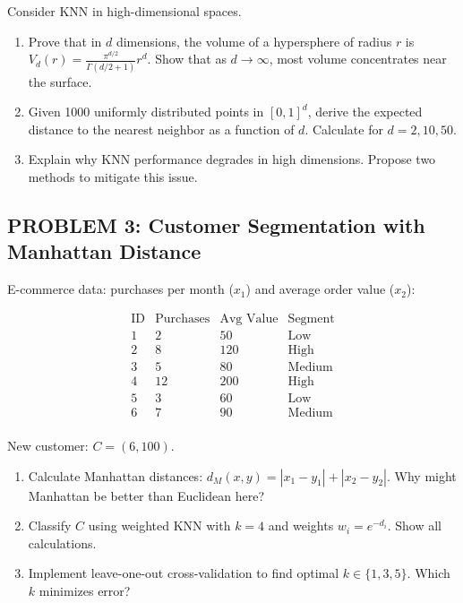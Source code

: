 \documentclass[12pt]{article}
\begin{document}
Consider KNN in high-dimensional spaces.

\begin{enumerate}
\item[(a)] Prove that in \(d\) dimensions, the volume of a hypersphere of radius \(r\) is \(V_d(r) = \frac{\pi^{d/2}}{\Gamma(d/2 + 1)}r^d\). Show that as \(d \to \infty\), most volume concentrates near the surface.
\item[(b)] Given 1000 uniformly distributed points in \([0,1]^d\), derive the expected distance to the nearest neighbor as a function of \(d\). Calculate for \(d = 2, 10, 50\).
\item[(c)] Explain why KNN performance degrades in high dimensions. Propose two methods to mitigate this issue.
\end{enumerate}

\subsection*{PROBLEM 3: Customer Segmentation with Manhattan Distance}

E-commerce data: purchases per month (\(x_1\)) and average order value (\(x_2\)):

\[\begin{array}{c|cc|c}
\text{ID} & \text{Purchases} & \text{Avg Value} & \text{Segment} \\
\hline
1 & 2 & 50 & \text{Low} \\
2 & 8 & 120 & \text{High} \\
3 & 5 & 80 & \text{Medium} \\
4 & 12 & 200 & \text{High} \\
5 & 3 & 60 & \text{Low} \\
6 & 7 & 90 & \text{Medium} \\
\end{array}\]

New customer: \(C = (6, 100)\).

\begin{enumerate}
\item[(a)] Calculate Manhattan distances: \(d_M(x,y) = |x_1-y_1| + |x_2-y_2|\). Why might Manhattan be better than Euclidean here?
\item[(b)] Classify \(C\) using weighted KNN with \(k=4\) and weights \(w_i = e^{-d_i}\). Show all calculations.
\item[(c)] Implement leave-one-out cross-validation to find optimal \(k \in \{1,3,5\}\). Which \(k\) minimizes error?
\end{enumerate}
\end{document}
